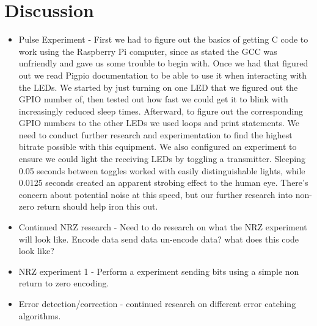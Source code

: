 \documentclass{article}
\begin{document}
\section*{Discussion}
\begin{itemize}
\item Pulse Experiment - First we had to figure out the basics of getting C code to work using the Raspberry Pi computer, since as stated the GCC was unfriendly and gave us some trouble to begin with. Once we had that figured out we read Pigpio documentation to be able to use it when interacting with the LEDs. We started by just turning on one LED that we figured out the GPIO number of, then tested out how fast we could get it to blink with increasingly reduced sleep times. Afterward, to figure out the corresponding GPIO numbers to the other LEDs we used loops and print statements. We need to conduct further research and experimentation to find the highest bitrate possible with this equipment. We also configured an experiment to ensure we could light the receiving LEDs by toggling a transmitter. Sleeping 0.05 seconds between toggles worked with easily distinguishable lights, while 0.0125 seconds created an apparent strobing effect to the human eye. There's concern about potential noise at this speed, but our further research into non-zero return should help iron this out.
\item Continued NRZ research - Need to do research on what the NRZ experiment will look like. Encode data send data un-encode data? what does this code look like?
\item NRZ experiment 1 - Perform a experiment sending bits using a simple non return to zero encoding.
\item Error detection/correction - continued research on different error catching algorithms.

\end{itemize}
\end{document}
